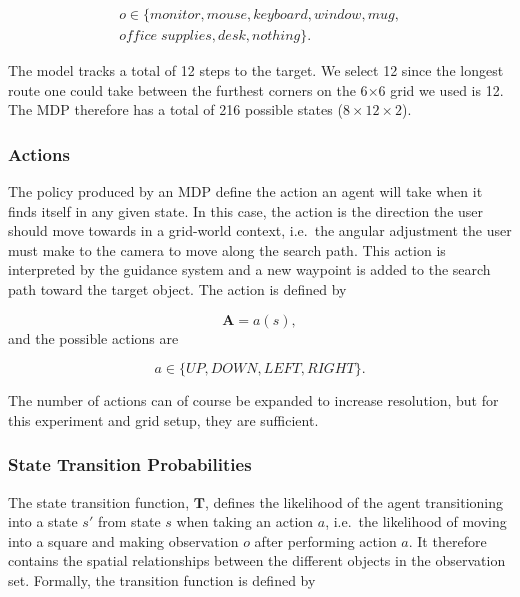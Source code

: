 \documentclass[a4paper, twoside]{article}
\begin{document}
\begin{equation}
  \begin{aligned}
    o\in \{monitor, mouse, keyboard, window, mug,\\ office\;supplies, desk, nothing\}.
  \end{aligned}
\end{equation}

The model tracks a total of 12 steps to the target. We select 12 since the longest route one could take between the furthest corners on the 6$\times$6 grid we used is 12. The MDP therefore has a total of 216 possible states ($8\times12\times2$).

\subsubsection{Actions}

The policy produced by an MDP define the action an agent will take when it finds itself in any given state. In this case, the action is the direction the user should move towards in a grid-world context, i.e.\ the angular adjustment the user must make to the camera to move along the search path. This action is interpreted by the guidance system and a new waypoint is added to the search path toward the target object. The action is defined by

\begin{equation}
  \mathbf{A} = a(s),
\end{equation}
and the possible actions are

\begin{equation}
  a\in \{UP, DOWN, LEFT, RIGHT\}.
\end{equation}

The number of actions can of course be expanded to increase resolution, but for this experiment and grid setup, they are sufficient. 

\subsubsection{State Transition Probabilities}

\noindent The state transition function, $\mathbf{T}$, defines the likelihood of the agent transitioning into a state $s'$ from state $s$ when taking an action $a$, i.e.\ the likelihood of moving into a square and making observation $o$ after performing action $a$. It therefore contains the spatial relationships between the different objects in the observation set. Formally, the transition function is defined by
\end{document}
